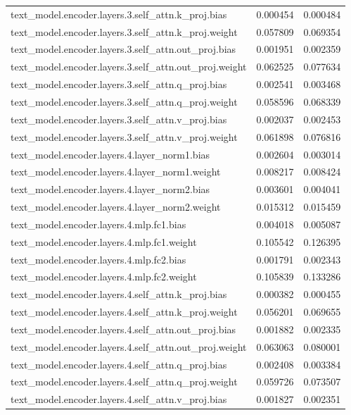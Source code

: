 \begin{longtable}{lcc}
text\_model.encoder.layers.3.self\_attn.k\_proj.bias & 0.000454 & 0.000484 \\
text\_model.encoder.layers.3.self\_attn.k\_proj.weight & 0.057809 & 0.069354 \\
text\_model.encoder.layers.3.self\_attn.out\_proj.bias & 0.001951 & 0.002359 \\
text\_model.encoder.layers.3.self\_attn.out\_proj.weight & 0.062525 & 0.077634 \\
text\_model.encoder.layers.3.self\_attn.q\_proj.bias & 0.002541 & 0.003468 \\
text\_model.encoder.layers.3.self\_attn.q\_proj.weight & 0.058596 & 0.068339 \\
text\_model.encoder.layers.3.self\_attn.v\_proj.bias & 0.002037 & 0.002453 \\
text\_model.encoder.layers.3.self\_attn.v\_proj.weight & 0.061898 & 0.076816 \\
text\_model.encoder.layers.4.layer\_norm1.bias & 0.002604 & 0.003014 \\
text\_model.encoder.layers.4.layer\_norm1.weight & 0.008217 & 0.008424 \\
text\_model.encoder.layers.4.layer\_norm2.bias & 0.003601 & 0.004041 \\
text\_model.encoder.layers.4.layer\_norm2.weight & 0.015312 & 0.015459 \\
text\_model.encoder.layers.4.mlp.fc1.bias & 0.004018 & 0.005087 \\
text\_model.encoder.layers.4.mlp.fc1.weight & 0.105542 & 0.126395 \\
text\_model.encoder.layers.4.mlp.fc2.bias & 0.001791 & 0.002343 \\
text\_model.encoder.layers.4.mlp.fc2.weight & 0.105839 & 0.133286 \\
text\_model.encoder.layers.4.self\_attn.k\_proj.bias & 0.000382 & 0.000455 \\
text\_model.encoder.layers.4.self\_attn.k\_proj.weight & 0.056201 & 0.069655 \\
text\_model.encoder.layers.4.self\_attn.out\_proj.bias & 0.001882 & 0.002335 \\
text\_model.encoder.layers.4.self\_attn.out\_proj.weight & 0.063063 & 0.080001 \\
text\_model.encoder.layers.4.self\_attn.q\_proj.bias & 0.002408 & 0.003384 \\
text\_model.encoder.layers.4.self\_attn.q\_proj.weight & 0.059726 & 0.073507 \\
text\_model.encoder.layers.4.self\_attn.v\_proj.bias & 0.001827 & 0.002351 \\

\end{longtable}

